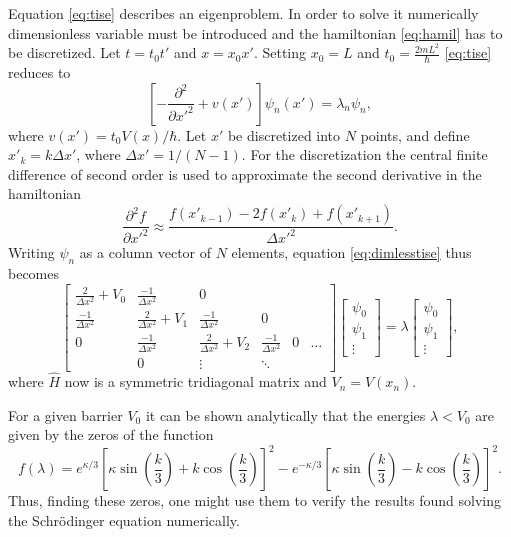 \documentclass[a4paper, 11pt]{article}
\newcommand{\ddel}[2]{\frac{\partial^2 #1}{\partial #2^2}}
\begin{document}
Equation \eqref{eq:tise} describes an eigenproblem.
In order to solve it numerically dimensionless variable must be introduced and the hamiltonian \eqref{eq:hamil} has to be discretized.
Let $t=t_0 t'$ and $x=x_0 x'$.
Setting $x_0 = L$ and $t_0 = \frac{2mL^2}{\hbar}$ \eqref{eq:tise} reduces to
\begin{equation}\label{eq:dimlesstise}
\left[-\ddel{}{x'} + v(x') \right] \psi_n(x') = \lambda_n \psi_n,
\end{equation}
where $v(x') = t_0 V(x)/\hbar$.
Let $x'$ be discretized into $N$ points, and define $x'_k = k \Delta x'$, where $\Delta x' = 1/(N-1)$.
For the discretization the central finite difference of second order is used to approximate the second derivative in the hamiltonian
\begin{equation}
\ddel{f}{x'} \approx \frac{f(x'_{k-1}) - 2f(x'_k) + f(x'_{k+1})}{\Delta x'^2}.
\end{equation}
Writing $\psi_n$ as a column vector of $N$ elements, equation \eqref{eq:dimlesstise} thus becomes
\begin{equation}
\begin{bmatrix}
\frac{2}{\Delta x^2} + V_0 & \frac{-1}{\Delta x^2} & 0 & \\
\frac{-1}{\Delta x^2} & \frac{2}{\Delta x^2} + V_1 & \frac{-1}{\Delta x^2} & 0  \\
0 & \frac{-1}{\Delta x^2} & \frac{2}{\Delta x^2} + V_2 & \frac{-1}{\Delta x^2} & 0 & \dots\\
&0&\vdots&\ddots
\end{bmatrix}
\begin{bmatrix}
\psi_0\\
\psi_1\\
\vdots
\end{bmatrix}
=
\lambda
\begin{bmatrix}
\psi_0\\
\psi_1\\
\vdots
\end{bmatrix},
\end{equation}
where $\hat{H}$ now is a symmetric tridiagonal matrix and $V_n = V(x_n)$.



For a given barrier $V_0$ it can be shown analytically\cite{assignment} that the energies $\lambda < V_0$ are given by the zeros of the function
\begin{equation}\label{eq:zero}
f(\lambda) = e^{\kappa/3} \left[
\kappa\sin\left(\frac{k}{3}\right) + k\cos\left(\frac{k}{3}\right)
\right]^2
-
e^{-\kappa/3} \left[
\kappa\sin\left(\frac{k}{3}\right) - k\cos\left(\frac{k}{3}\right)
\right]^2.
\end{equation}
Thus, finding these zeros, one might use them to verify the results found solving the Schrödinger equation numerically.
\end{document}
